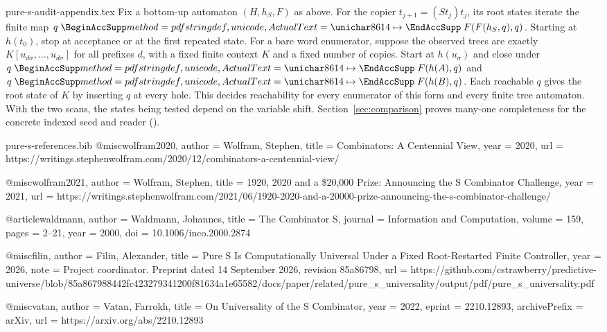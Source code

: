 \begin{filecontents*}[overwrite]{pure-s-audit-appendix.tex}
Fix a bottom-up automaton $(H,h_S,F)$ as above. For the copier
$t_{j+1}=(S t_j)t_j$, its root states iterate the finite map
$q\copymapsto F(F(h_S,q),q)$. Starting at $h(t_0)$, stop at acceptance or at
the first repeated state. For a bare word enumerator, suppose the observed
trees are exactly $K[u_{d\sigma},\ldots,u_{d\sigma}]$ for all prefixes
$d$, with a fixed finite context $K$ and a fixed number of copies.
Start at $h(u_\sigma)$ and close under $q\copymapsto F(h(A),q)$ and
$q\copymapsto F(h(B),q)$. Each reachable $q$ gives the root state of $K$
by inserting $q$ at every hole. This decides reachability for every
enumerator of this form and every finite tree automaton. With the two
scans, the states being tested depend on the variable shift.
Section~\ref{sec:comparison} proves many-one completeness for the
concrete indexed seed and reader ().
\end{filecontents*}
\begin{filecontents*}[overwrite]{pure-s-references.bib}
@misc{wolfram2020,
  author = {Wolfram, Stephen},
  title = {Combinators: A Centennial View},
  year = {2020},
  url = {https://writings.stephenwolfram.com/2020/12/combinators-a-centennial-view/}
}

@misc{wolfram2021,
  author = {Wolfram, Stephen},
  title = {1920, 2020 and a \$20,000 Prize: Announcing the {S} Combinator Challenge},
  year = {2021},
  url = {https://writings.stephenwolfram.com/2021/06/1920-2020-and-a-20000-prize-announcing-the-s-combinator-challenge/}
}

@article{waldmann,
  author = {Waldmann, Johannes},
  title = {The Combinator {S}},
  journal = {Information and Computation},
  volume = {159},
  pages = {2--21},
  year = {2000},
  doi = {10.1006/inco.2000.2874}
}

@misc{filin,
  author = {Filin, Alexander},
  title = {Pure {S} Is Computationally Universal Under a Fixed Root-Restarted Finite Controller},
  year = {2026},
  note = {Project coordinator. Preprint dated 14 September 2026, revision 85a86798},
  url = {https://github.com/cstrawberry/predictive-universe/blob/85a867988442fc423279341200f81634a1e65582/docs/paper/related/pure_s_universality/output/pdf/pure_s_universality.pdf}
}

@misc{vatan,
  author = {Vatan, Farrokh},
  title = {On Universality of the {S} Combinator},
  year = {2022},
  eprint = {2210.12893},
  archivePrefix = {arXiv},
  url = {https://arxiv.org/abs/2210.12893}
}
\end{filecontents*}
